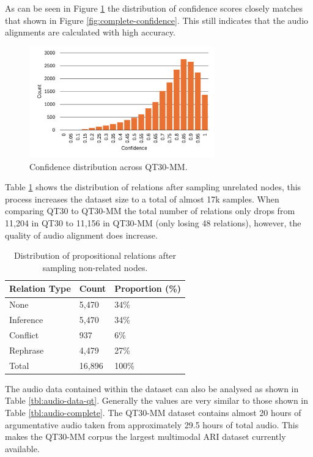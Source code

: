 \documentclass[twocolumn,twoside]{article}
\begin{document}
As can be seen in Figure \ref{fig:qt30-mm-confidence} the distribution
of confidence scores closely matches that shown in Figure
\ref{fig:complete-confidence}. This still indicates that the audio
alignments are calculated with high accuracy.

\begin{figure}[h]
\centering
\includegraphics[width=8cm]{qt30-mm-confidence}
\caption{Confidence distribution across QT30-MM. \label{fig:qt30-mm-confidence}}
\end{figure}

Table \ref{tbl:qt-mm-rel-no} shows the distribution of relations after
sampling unrelated nodes, this process increases the dataset size to a
total of almost 17k samples. When comparing QT30 to QT30-MM the total
number of relations only drops from 11,204 in QT30 to 11,156 in QT30-MM
(only losing 48 relations), however, the quality of audio alignment does
increase.

\begin{table}[h]
\centering
\caption{Distribution of propositional relations after sampling non-related nodes. \label{tbl:qt-mm-rel-no}}
\begin{tabular}{|l|ll|}
\hline
Relation Type & Count  & Proportion (\%) \\ \hline
None          & 5,470  & 34\%            \\
Inference     & 5,470  & 34\%            \\
Conflict      & 937    & 6\%             \\
Rephrase      & 4,479  & 27\%            \\ \hline
Total         & 16,896 & 100\%           \\ \hline
\end{tabular}
\end{table}

The audio data contained within the dataset can also be analysed as
shown in Table \ref{tbl:audio-data-qt}. Generally the values are very
similar to those shown in Table \ref{tbl:audio-complete}. The QT30-MM
dataset contains almost 20 hours of argumentative audio taken from
approximately 29.5 hours of total audio. This makes the QT30-MM corpus
the largest multimodal ARI dataset currently available.
\end{document}
